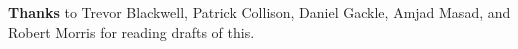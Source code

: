                     \textbf{Thanks} to Trevor Blackwell, Patrick Collison, Daniel
                    Gackle, Amjad Masad, and Robert Morris for reading drafts of
                    this. 


              
            
          
